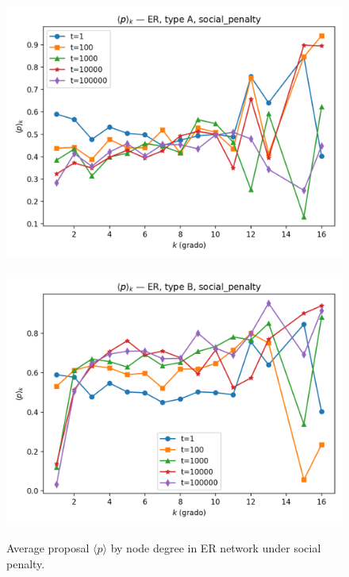 \begin{figure}[h!]
    \centering
    \setlength{\tabcolsep}{2pt}
    \begin{minipage}[t]{0.48\textwidth}
        \centering
        \includegraphics[width=\textwidth]{images/TASK1/p_by_degree_ER_A_social_penalty.png}
        \label{fig:ER_lowdeg_p_SP}
    \end{minipage}
    \hfill
    \begin{minipage}[t]{0.48\textwidth}
        \centering
        \includegraphics[width=\textwidth]{images/TASK1/p_by_degree_ER_B_social_penalty.png}
        \label{fig:ER_highdeg_p_SP}
    \end{minipage}
    \caption{Average proposal $\langle p \rangle$ by node degree in ER network under social penalty.}
    \label{fig:ER_p_by_degree_SP}
\end{figure}


